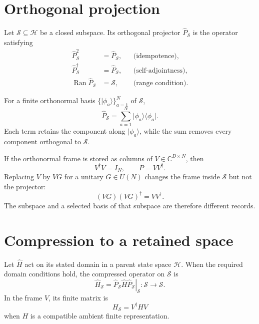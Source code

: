\section{Orthogonal projection}

\begin{definition}
Let \(\mathcal S\subseteq\mathcal H\) be a closed subspace. Its orthogonal
projector \(\hat P_{\mathcal S}\) is the operator satisfying
\begin{equation}
\begin{aligned}
  \hat P_{\mathcal S}^{2}&=\hat P_{\mathcal S},
  &&\text{(idempotence)},\\
  \hat P_{\mathcal S}^{\dagger}&=\hat P_{\mathcal S},
  &&\text{(self-adjointness)},\\
  \operatorname{Ran}\hat P_{\mathcal S}&=\mathcal S,
  &&\text{(range condition)}.
\end{aligned}
\end{equation}
\end{definition}

For a finite orthonormal basis
\(\{\lvert\phi_a\rangle\}_{a=1}^{N}\) of \(\mathcal S\),
\begin{equation}
  \hat P_{\mathcal S}
  =\sum_{a=1}^{N}\lvert\phi_a\rangle\langle\phi_a\rvert.
\end{equation}
Each term retains the component along \(\lvert\phi_a\rangle\), while the sum
removes every component orthogonal to \(\mathcal S\).

If the orthonormal frame is stored as columns of
\(V\in\mathbb C^{D\times N}\), then
\begin{equation}
  V^{\dagger}V=I_N,
  \qquad
  P=VV^{\dagger}.
\end{equation}
Replacing \(V\) by \(VG\) for a unitary \(G\in U(N)\) changes the frame inside
\(\mathcal S\) but not the projector:
\begin{equation}
  (VG)(VG)^{\dagger}=VV^{\dagger}.
\end{equation}
The subspace and a selected basis of that subspace are therefore different
records.

\section{Compression to a retained space}

Let \(\widehat H\) act on its stated domain in a parent state space
\(\mathcal H\). When the required domain conditions hold, the compressed
operator on \(\mathcal S\) is
\begin{equation}
  \widehat H_{\mathcal S}
  =\left.\hat P_{\mathcal S}\widehat H\hat P_{\mathcal S}\right|_{\mathcal S}
  :\mathcal S\longrightarrow\mathcal S.
\end{equation}
In the frame \(V\), its finite matrix is
\begin{equation}
  H_{\mathcal S}=V^{\dagger}HV
\end{equation}
when \(H\) is a compatible ambient finite representation.

